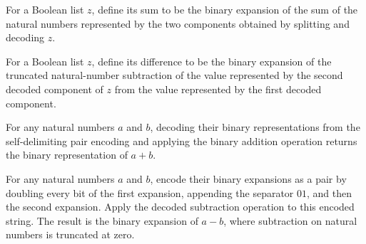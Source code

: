 \begin{definition}
\label{Complexity.BinArith.add}
\leanok
{}
For a Boolean list $z$, define its sum to be the binary expansion of the sum of the
natural numbers represented by the two components obtained by splitting and decoding
$z$.
\end{definition}

\begin{definition}
\label{Complexity.BinArith.sub}
\leanok
{}
For a Boolean list $z$, define its difference to be the binary expansion of the
truncated natural-number subtraction of the value represented by the second decoded
component of $z$ from the value represented by the first decoded component.
\end{definition}

\begin{theorem}
\label{Complexity.BinArith.add_pairEncode}
\leanok
{}
For any natural numbers $a$ and $b$, decoding their binary representations from the
self-delimiting pair encoding and applying the binary addition operation returns the
binary representation of $a+b$.
\end{theorem}

\begin{theorem}
\label{Complexity.BinArith.sub_pairEncode}
\leanok
{}
For any natural numbers $a$ and $b$, encode their binary expansions as a pair by
doubling every bit of the first expansion, appending the separator $01$, and then the
second expansion. Apply the decoded subtraction operation to this encoded string. The
result is the binary expansion of $a-b$, where subtraction on natural numbers is
truncated at zero.
\end{theorem}

